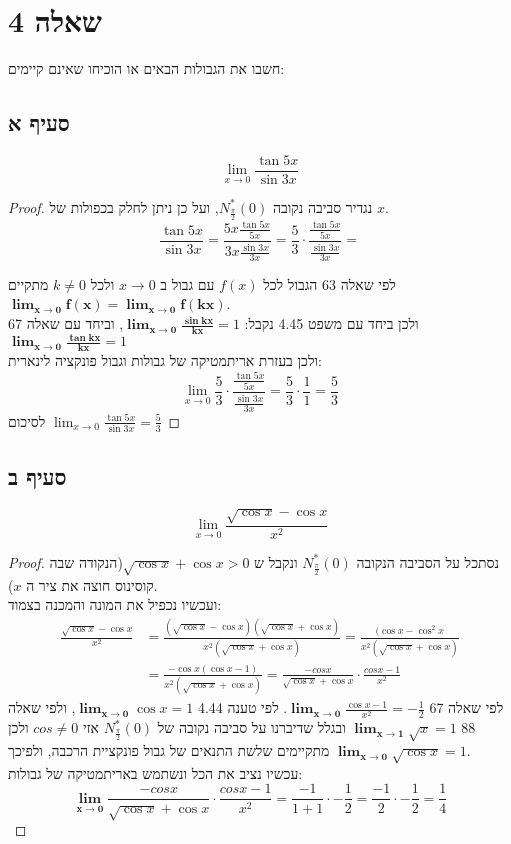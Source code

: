 \documentclass{article}
\begin{document}
	\pagebreak
	\section*{שאלה 4}
	חשבו את הגבולות הבאים או הוכיחו שאינם קיימים:
	\subsection*{סעיף א}
	\[ \lim_{x \to 0} \frac{\tan 5x}{\sin 3x} \]
	\begin{proof}
		נגדיר סביבה נקובה $N^{*}_{\frac{\pi}{2}}(0)$, ועל כן ניתן לחלק בכפולות של $x$.
		\[
			\frac{\tan 5x}{\sin 3x} =
			\frac{5x \frac{\tan 5x}{5x}}{3x \frac{\sin 3x}{3x}} =
			\frac{5}{3} \cdot \frac{\frac{\tan 5x}{5x}}{\frac{\sin 3x}{3x}} =
		\]

		לפי שאלה 63 הגבול לכל $f(x)$ עם גבול ב $x \to 0$ ולכל $k \neq 0$ מתקיים $\bm{\lim_{x \to 0} f(x) = \lim_{x \to 0} f(kx)}$. \\
		ולכן ביחד עם משפט 4.45 נקבל: $\bm{\lim_{x \to 0}\frac{\sin kx}{kx}} = 1$, וביחד עם שאלה 67 $\bm{\lim_{x \to 0}\frac{\tan kx}{kx}} = 1$ \\
		ולכן בעזרת אריתמטיקה של גבולות וגבול פונקציה לינארית:
		\[
			\lim_{x \to 0}
			\frac{5}{3} \cdot \frac{\frac{\tan 5x}{5x}}{\frac{\sin 3x}{3x}} =
			\frac{5}{3} \cdot \frac{1}{1} = \frac{5}{3}
		\]
		לסיכום $\lim_{x \to 0} \frac{\tan 5x}{\sin 3x} = \frac{5}{3}$
	\end{proof}

	\subsection*{סעיף ב}
	\[ \lim_{x \to 0} \frac{\sqrt{\cos x} - \cos x}{x^2} \]
	\begin{proof}
		נסתכל על הסביבה הנקובה $N^{*}_{\frac{\pi}{2}}(0)$ ונקבל ש $\sqrt{\cos x} + \cos x > 0$(הנקודה שבה קוסינוס חוצה את ציר ה $x$). \\
		ועכשיו נכפיל את המונה והמכנה בצמוד:
		\begin{align*}
			\frac{\sqrt{\cos x} - \cos x}{x^2} &=
			\frac{(\sqrt{\cos x} - \cos x)(\sqrt{\cos x} + \cos x)}{x^2(\sqrt{\cos x} + \cos x)} =
			\frac{(\cos x - \cos^2 x}{x^2(\sqrt{\cos x} + \cos x)} \\
			&= \frac{-\cos x(\cos x - 1)}{x^2(\sqrt{\cos x} + \cos x)} =
			\frac{-cos x}{\sqrt{\cos x} + \cos x} \cdot \frac{cos x - 1}{x^2}
		\end{align*}
		לפי שאלה 67 $\bm{\lim_{x \to 0}} \frac{\cos x -1}{x^2} = - \frac{1}{2}$.
		לפי טענה 4.44 $\bm{\lim_{x \to 0}} \cos x = 1$,
		ולפי שאלה 88 $\bm{\lim_{x \to 1}} \sqrt{x} = 1$
		ובגלל שדיברנו על סביבה נקובה של $N^{*}_{\frac{\pi}{2}}(0)$ אזי $cos \neq 0$
		ולכן מתקיימים שלשת התנאים של גבול פונקציית הרכבה, ולפיכך $\bm{\lim_{x \to 0}} \sqrt{\cos x} = 1$. \\
		עכשיו נציב את הכל ונשתמש באריתמטיקה של גבולות:
		\[
			\bm{\lim_{x \to 0}}
			\frac{-cos x}{\sqrt{\cos x} + \cos x} \cdot \frac{cos x - 1}{x^2} =
			\frac{-1}{1 + 1} \cdot -\frac{1}{2} =
			\frac{-1}{2} \cdot -\frac{1}{2} =
			\frac{1}{4}
		\]
	\end{proof}
\end{document}
